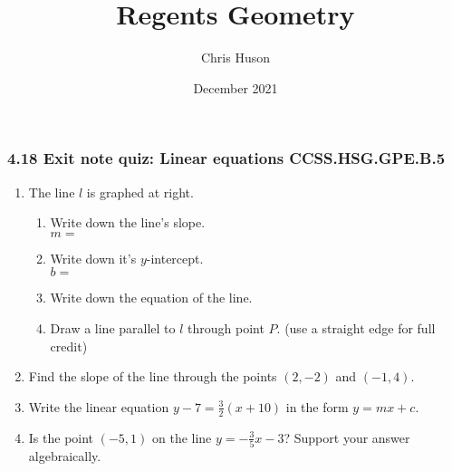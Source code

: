 \documentclass[12pt, twoside]{article}
\title{Regents Geometry}
\author{Chris Huson}
\date{December 2021}
\begin{document}
\subsubsection*{4.18 Exit note quiz: Linear equations \hfill CCSS.HSG.GPE.B.5}
\begin{enumerate}
\item The line $l$ is graphed at right.
\begin{multicols}{2}
\begin{enumerate}
  \item Write down the line's slope.\\ $m=$
  \vspace{0.5cm}
  \item Write down it's $y$-intercept.\\ $b=$
  \vspace{0.5cm}
  \item Write down the equation of the line.
  \vspace{1.5cm}
  \item Draw a line parallel to $l$ through point $P$. (use a straight edge for full credit)
\end{enumerate} \vspace{.5cm}
  \begin{center} 
  \end{center}
\end{multicols}

\item Find the slope of the line through the points $(2, -2)$ and $(-1, 4)$. \vspace{4cm}

\item Write the linear equation $\displaystyle y-7=\frac{3}{2}(x+10)$ in the form $y=mx+c$. \vspace{4cm}

\item Is the point $(-5,1)$ on the line $\displaystyle y=-\frac{3}{5}x-3$? Support your answer algebraically.


\end{enumerate}
\end{document}

